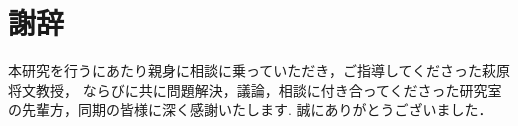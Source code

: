 \chapter*{謝辞}
本研究を行うにあたり親身に相談に乗っていただき，ご指導してくださった萩原将文教授，
ならびに共に問題解決，議論，相談に付き合ってくださった研究室の先輩方，同期の皆様に深く感謝いたします.
誠にありがとうございました．